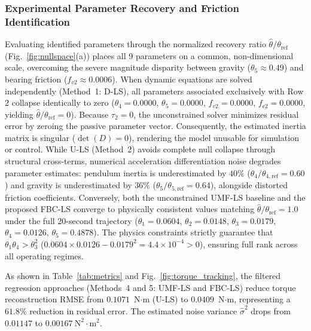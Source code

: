\documentclass[lettersize,journal]{IEEEtran}
\begin{document}
\subsubsection{Experimental Parameter Recovery and Friction Identification}
Evaluating identified parameters through the normalized recovery ratio $\hat{\theta}/\theta_{\text{ref}}$ (Fig.~\ref{fig:nullspace}(a)) places all 9 parameters on a common, non-dimensional scale, overcoming the severe magnitude disparity between gravity ($\theta_5 \approx 0.49$) and bearing friction ($f_{v2} \approx 0.0006$). When dynamic equations are solved independently (Method~1: D-LS), all parameters associated exclusively with Row 2 collapse identically to zero ($\theta_4 = 0.0000$, $\theta_5 = 0.0000$, $f_{v2} = 0.0000$, $f_{c2} = 0.0000$, yielding $\hat{\theta}/\theta_{\text{ref}} = 0$). Because $\tau_2 = 0$, the unconstrained solver minimizes residual error by zeroing the passive parameter vector. Consequently, the estimated inertia matrix is singular ($\det(D) = 0$), rendering the model unusable for simulation or control. While U-LS (Method~2) avoids complete null collapse through structural cross-terms, numerical acceleration differentiation noise degrades parameter estimates: pendulum inertia is underestimated by $40\%$ ($\theta_4/\theta_{4,\text{ref}} = 0.60$) and gravity is underestimated by $36\%$ ($\theta_5/\theta_{5,\text{ref}} = 0.64$), alongside distorted friction coefficients. Conversely, both the unconstrained UMF-LS baseline and the proposed FBC-LS converge to physically consistent values matching $\hat{\theta}/\theta_{\text{ref}} = 1.0$ under the full 20-second trajectory ($\theta_1 = 0.0604$, $\theta_2 = 0.0148$, $\theta_3 = 0.0179$, $\theta_4 = 0.0126$, $\theta_5 = 0.4878$). The physics constraints strictly guarantee that $\theta_1 \theta_4 > \theta_3^2$ ($0.0604 \times 0.0126 - 0.0179^2 = 4.4 \times 10^{-4} > 0$), ensuring full rank across all operating regimes.

As shown in Table~\ref{tab:metrics} and Fig.~\ref{fig:torque_tracking}, the filtered regression approaches (Methods~4 and 5: UMF-LS and FBC-LS) reduce torque reconstruction RMSE from $0.1071$~N$\cdot$m (U-LS) to $0.0409$~N$\cdot$m, representing a $61.8\%$ reduction in residual error. The estimated noise variance $\hat{\sigma}^2$ drops from $0.01147$ to $0.00167~\text{N}^2\cdot\text{m}^2$.
\end{document}
